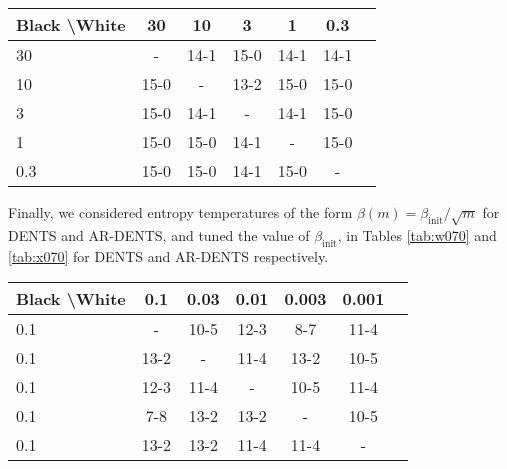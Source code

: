     \begin{table*}[]
    \centering
        \begin{tabular}{l|cccccc}
            \textbf{Black \textbackslash White}     & 30  & 10   & 3   & 1    & 0.3    \\ 
            \hline
                                    30            & -     	&  14-1 		& 15-0  		& 14-1  		& 14-1  		\\
                                    10            &  15-0 		& -     	&  13-2		& 15-0  		&  15-0 		\\
                                    3          &  15-0  	&   14-1 	&   -   &  14-1 		&  15-0 		\\
                                    1          &   	15-0	&  15-0 		&  14-1 		& -     	& 15-0  		\\
                                    0.3         &   15-0		&   	15-0	&   14-1		& 15-0  		&   -   	\\    
        \end{tabular}
        \caption{Results for round robin to select the temperature parameter $\alpha$ for AR-TENTS. The value of 3.0 won the most matches so was selected. \label{tab:x060}}
    \end{table*}
    
    
    
    
    
    
    
    
    
    
    Finally, we considered entropy temperatures of the form $\beta(m)=\beta_{\text{init}}/\sqrt{m}$ for DENTS and AR-DENTS, and tuned the value of $\beta_{\text{init}}$, in Tables \ref{tab:w070} and \ref{tab:x070} for DENTS and AR-DENTS respectively.
    
    
    \begin{table*}[]
    \centering
        \begin{tabular}{l|cccccc}
            \textbf{Black \textbackslash White}     & 0.1  & 0.03   & 0.01   & 0.003    & 0.001    \\ 
            \hline
                                    0.1            & - & 10-5 & 12-3 & 8-7 & 11-4  		\\
                                    0.1            & 13-2 & - & 11-4 & 13-2  & 10-5   		\\
                                    0.1            & 12-3 & 11-4 & - & 10-5 & 11-4  		\\
                                    0.1            & 7-8 & 13-2 & 13-2 & - & 10-5  		\\
                                    0.1            & 13-2 & 13-2 & 11-4 & 11-4 &  - 		\\
        \end{tabular}
        \caption{Results for round robin to select the initial entropy temperature $\beta_{\text{init}}$ for DENTS. The value of 0.3 won the most matches so was selected. \label{tab:w070}}
    \end{table*}
    
